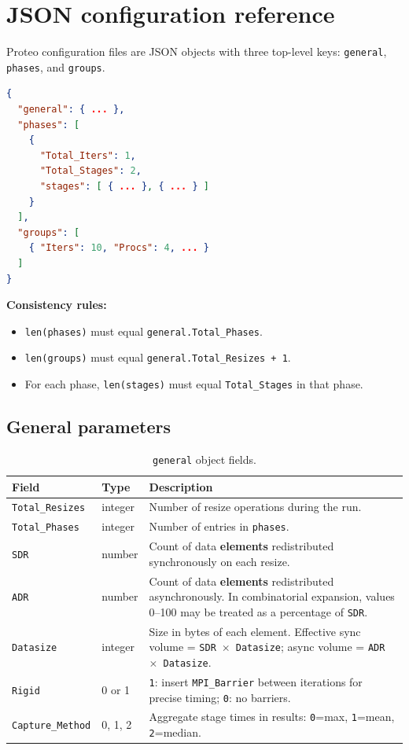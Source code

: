 \section{JSON configuration reference}
\label{section:json-config}

Proteo configuration files are JSON objects with three top-level keys: \texttt{general}, \texttt{phases}, and \texttt{groups}.

\begin{lstlisting}[language=json,caption={Top-level schema.},label=code:json-top,captionpos=b]
{
  "general": { ... },
  "phases": [
    {
      "Total_Iters": 1,
      "Total_Stages": 2,
      "stages": [ { ... }, { ... } ]
    }
  ],
  "groups": [
    { "Iters": 10, "Procs": 4, ... }
  ]
}
\end{lstlisting}

\textbf{Consistency rules:}
\begin{itemize}
  \item \texttt{len(phases)} must equal \texttt{general.Total\_Phases}.
  \item \texttt{len(groups)} must equal \texttt{general.Total\_Resizes + 1}.
  \item For each phase, \texttt{len(stages)} must equal \texttt{Total\_Stages} in that phase.
\end{itemize}

\subsection{General parameters}

\begin{table}[H]
\centering
\small
\begin{tabular}{@{}llp{7cm}@{}}
\toprule
\textbf{Field} & \textbf{Type} & \textbf{Description} \\
\midrule
\texttt{Total\_Resizes} & integer & Number of resize operations during the run. \\
\texttt{Total\_Phases} & integer & Number of entries in \texttt{phases}. \\
\texttt{SDR} & number & Count of data \textbf{elements} redistributed synchronously on each resize. \\
\texttt{ADR} & number & Count of data \textbf{elements} redistributed asynchronously. In combinatorial expansion, values 0--100 may be treated as a percentage of \texttt{SDR}. \\
\texttt{Datasize} & integer & Size in bytes of each element. Effective sync volume = \texttt{SDR}~$\times$~\texttt{Datasize}; async volume = \texttt{ADR}~$\times$~\texttt{Datasize}. \\
\texttt{Rigid} & 0 or 1 & \texttt{1}: insert \texttt{MPI\_Barrier} between iterations for precise timing; \texttt{0}: no barriers. \\
\texttt{Capture\_Method} & 0, 1, 2 & Aggregate stage times in results: \texttt{0}=max, \texttt{1}=mean, \texttt{2}=median. \\
\bottomrule
\end{tabular}
\caption{\texttt{general} object fields.}
\label{tab:general-fields}
\end{table}

